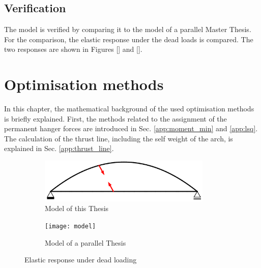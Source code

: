 \newpage
\section{Verification}
The model is verified by comparing it to the model of a parallel Master Thesis. For the comparison, the elastic response under the dead loads is compared. The two responses are shown in Figures [] and [].


\newpage
\chapter{Optimisation methods}
In this chapter, the mathematical background of the used optimisation methods is briefly explained. First, the methods related to the assignment of the permanent hanger forces are introduced in Sec. \ref{app:moment_min} and \ref{app:lsq}. The calculation of the thrust line, including the self weight of the arch, is explained in Sec. \ref{app:thrust_line}.

\begin{figure}[H]
\centering
\begin{subfigure}{0.5\textwidth}
    \centering
    \includegraphics[trim={0 0cm 0 0},clip, width=0.9\textwidth]{overleaf/Appendix/Pictures/min_1.PNG}
    \caption{Model of this Thesis}
    \label{fig:verification_1}
\end{subfigure}%
\begin{subfigure}{.5\textwidth}
    \centering
    \texttt{[image: model]}
    \caption{Model of a parallel Thesis}
    \label{fig:verification_2}
\end{subfigure}
\caption{Elastic response under dead loading}
\label{fig:verification}
\end{figure}


